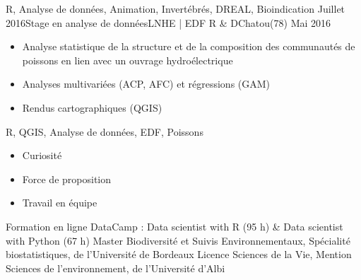 \documentclass[localFont,alternative]{yaac-another-awesome-cv}
\begin{document}
\begin{experiences}
{\begin{itemize}
                      \end{itemize}
                    }
                    {R, Analyse de données, Animation, Invertébrés, DREAL, Bioindication}
  \emptySeparator
  \experience
    {Juillet 2016}{Stage en analyse de données}{LNHE | EDF R \& D}{Chatou(78)}
    {Mai 2016}    {
                      \begin{itemize}
                        \item Analyse statistique de la structure et de la composition des communautés de poissons en lien avec un ouvrage hydroélectrique
                        \item Analyses multivariées (ACP, AFC) et régressions (GAM) 
                        \item Rendus cartographiques (QGIS)                   
                      \end{itemize}
                    }
                    {R, QGIS,  Analyse de données, EDF, Poissons}
  \emptySeparator
  
\end{experiences}

\twocolumnsection
{
\begin{skills}
\end{skills}}
{
\vspace{1em}
\begin{itemize}
	\item Curiosité
	\item Force de proposition                    
    \item Travail en équipe 
\end{itemize}
}


\begin{scholarship}

					{Formation en ligne DataCamp : Data scientist with R (95 h) \& Data scientist with Python (67 h)}
					{Master Biodiversité et Suivis Environnementaux, Spécialité biostatistiques, de l'Université de Bordeaux}
					{Licence Sciences de la Vie, Mention Sciences de l'environnement, de l'Université d'Albi}
\end{scholarship}

\end{document}
